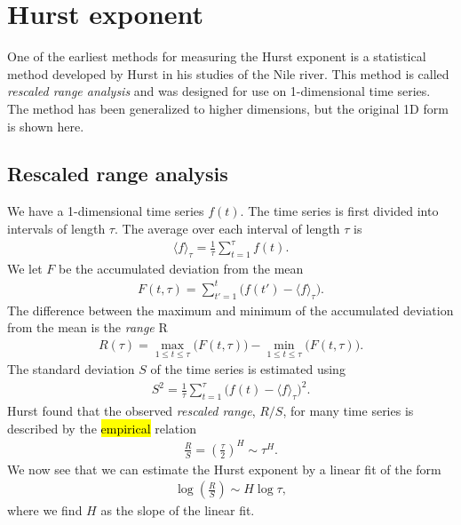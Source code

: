 \section{Hurst exponent}
One of the earliest methods for measuring the Hurst exponent is a statistical method developed by Hurst in his studies of the Nile river\cite{hurst1965longterm}\cite{hurst1951longterm}. This method is called \emph{rescaled range analysis} and was designed for use on 1-dimensional time series. The method has been generalized to higher dimensions\cite{fan2013rescaled}, but the original 1D form is shown here.
%

\subsection{Rescaled range analysis}
We have a 1-dimensional time series $f(t)$. The time series is first divided into  intervals of length $\tau$. The average over each interval of length $\tau$ is
\begin{align*}
    \langle f \rangle_\tau = \frac{1}{\tau} \sum_{t=1}^\tau f(t).
\end{align*}
We let $F$ be the accumulated deviation from the mean
\begin{align*}
    F(t, \tau) = \sum_{t' = 1}^t \big( f(t') - \langle f \rangle_\tau \big).
\end{align*}
The difference between the maximum and minimum of the accumulated deviation from the mean is the \emph{range} R
\begin{align*}
    R(\tau) = \max_{1 \leq t \leq \tau} \big(F(t,\tau)\big) - \min_{1 \leq t \leq \tau} \big(F(t, \tau)\big).
\end{align*}
The standard deviation $S$ of the time series is estimated using
\begin{align*}
    S^2 = \frac{1}{\tau} \sum_{t=1}^\tau \big( f(t) - \langle f \rangle_\tau \big)^2.
\end{align*}
Hurst found that the observed \emph{rescaled range}, $R/S$, for many time series is described by the \hl{empirical} relation\cite{feder1988fractals}
\begin{align*}
    \frac{R}{S} = \left(\frac{\tau}{2}\right)^H \sim \tau^H.
\end{align*}
We now see that we can estimate the Hurst exponent by a linear fit of the form
\begin{align*}
    \log \left(\frac{R}{S}\right) \sim H\log\tau,
\end{align*}
where we find $H$ as the slope of the linear fit.


